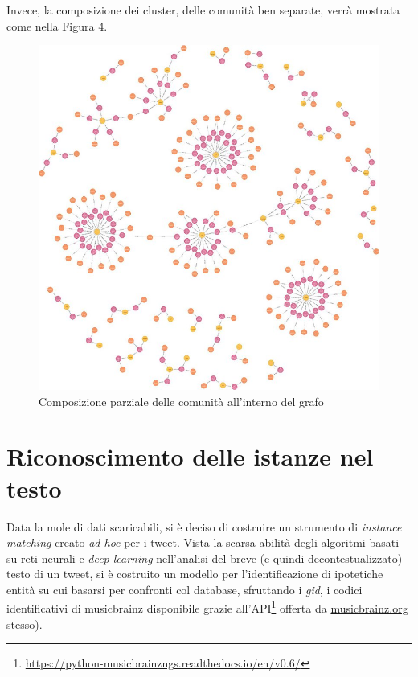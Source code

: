 \documentclass[12pt, a4paper, twocolumn]{article} %
\begin{document}
Invece, la composizione dei cluster, delle comunità ben separate, verrà mostrata come nella Figura 4.

\begin{figure}
	\centering
	\includegraphics{big_graph.png}
	\caption{Composizione parziale delle comunità all'interno del grafo}
\end{figure}

\section{Riconoscimento delle istanze nel testo}
Data la mole di dati scaricabili, si è deciso di costruire un strumento di \textit{instance matching} creato \textit{ad hoc} per i tweet.
Vista la scarsa abilità degli algoritmi basati su reti neurali e \textit{deep learning} nell'analisi del breve (e quindi decontestualizzato) testo di un tweet, si è costruito un modello per l'identificazione di ipotetiche entità su cui basarsi per confronti col database, sfruttando i \textit{gid}, i codici identificativi di musicbrainz disponibile grazie all'API\footnote{\url{https://python-musicbrainzngs.readthedocs.io/en/v0.6/}} offerta da \url{musicbrainz.org} stesso).
\end{document}
